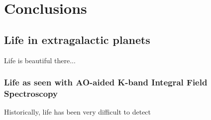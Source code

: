 \chapter{Conclusions}



\section{Life in extragalactic planets}

Life is beautiful there...

\subsection{Life as seen with AO-aided K-band Integral Field Spectroscopy}

Historically, life has been very difficult to detect

